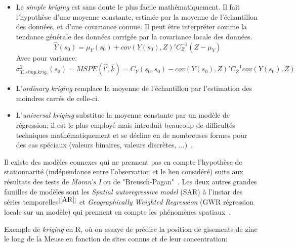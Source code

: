 \begin{itemize}
    \item Le \textit{simple kriging} est sans doute le plus facile mathématiquement. Il fait l'hypothèse d'une moyenne constante, estimée par la moyenne de l'échantillon des données, et d'une covariance connue. Il peut être interpréter comme la tendance générale des données corrigée par la covariance locale des données.
    \begin{equation}
        \hat{Y}(s_{0}) = \mu_{Y}(s_{0}) + cov(Y(s_{0}), Z)'C_{Z}^{-1}(Z - \mu_{Y})
    \end{equation}
    Avec pour variance:
    \begin{equation}
        \sigma_{Y, simp.krig.}^{2}(s_{0}) = MSPE(\hat{l'}, \hat{k}) = C_{Y}(s_{0}, s_{0}) - cov(Y(s_{0}), Z)'C_{Z}^{-1}cov(Y(s_{0}), Z)
    \end{equation}
    \item L'\textit{ordinary kriging} remplace la moyenne de l'échantillon par l'estimation des moindres carrés de celle-ci.
    \item L'\textit{universal kriging} substitue la moyenne constante par un modèle de régression; il est le plus employé mais introduit beaucoup de difficultés techniques mathématiquement et se décline en de nombreuses formes pour des cas spéciaux (valeurs binaires, valeurs discrètes, ...)~\cite{matheron1971theory}.
\end{itemize}

Il existe des modèles connexes qui ne prennent pas en compte l'hypothèse de stationnarité (indépendance entre l'observation et le lieu considéré) suite aux résultats des tests de \textit{Moran's I} ou de "Breusch-Pagan"~\cite{breusch1979simple}. Les deux autres grandes familles de modèles sont les \textit{Spatial autoregressive model} (SAR) à l'instar des séries temporelles$^{[\ref{AR}]}$ et \textit{Geographically Weighted Regression} (GWR régression locale sur un modèle) qui prennent en compte les phénomènes spatiaux~\cite{gelfand2010handbook}.

Exemple de \textit{kriging} en R, où on essaye de prédire la position de gisements de zinc le long de la Meuse en fonction de sites connus et de leur concentration:

\lstset{basicstyle=\scriptsize}


